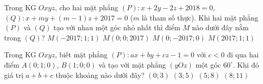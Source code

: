 \begin{ex}%
	Trong KG $Oxyz$, cho hai mặt phẳng $(P)\colon x+2y-2z+2018=0$, $(Q)\colon x+my+(m-1)z+2017=0$ ($m$ là tham số thực). Khi hai mặt phẳng $(P)$ và $(Q)$ tạo với nhau một góc nhỏ nhất thì điểm $M$ nào dưới đây nằm trong $(Q)$?
	\choice
	{\True $M(-2017;1;1)$}
	{$M(0;0;2017)$}
	{$M(0;-2017;0)$}
	{$M(2017;1;1)$}
\end{ex}
\begin{ex}%
	Trong KG $Oxyz$, biết mặt phẳng $(P):ax+by+cz-1=0$ với $c<0$ đi qua hai điểm $A(0;1;0)$, $B(1;0;0)$ và tạo với mặt phẳng $(yOz)$ một góc $60^\circ$. Khi đó giá trị $a+b+c$ thuộc khoảng nào dưới đây?
	\choice
	{\True $(0;3)$}
	{$(3;5)$}
	{$(5;8)$}
	{$(8;11)$}
\end{ex}
